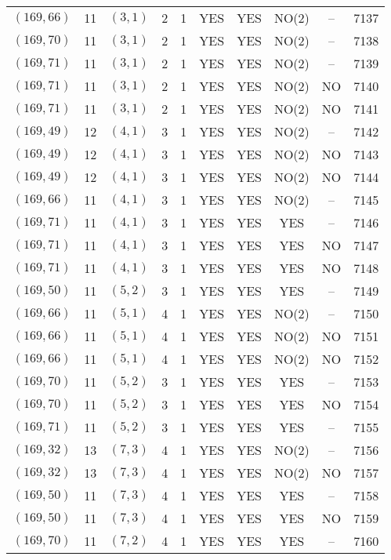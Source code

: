 \begin{longtable}{|c|c|c|c|c|c|c|c|c|c|}
$(169, 66)$ & 11 & $(3, 1)$ & 2 & 1 & YES & YES & NO(2) & -- & 7137\\
$(169, 70)$ & 11 & $(3, 1)$ & 2 & 1 & YES & YES & NO(2) & -- & 7138\\
$(169, 71)$ & 11 & $(3, 1)$ & 2 & 1 & YES & YES & NO(2) & -- & 7139\\
$(169, 71)$ & 11 & $(3, 1)$ & 2 & 1 & YES & YES & NO(2) & NO & 7140\\
$(169, 71)$ & 11 & $(3, 1)$ & 2 & 1 & YES & YES & NO(2) & NO & 7141\\
$(169, 49)$ & 12 & $(4, 1)$ & 3 & 1 & YES & YES & NO(2) & -- & 7142\\
$(169, 49)$ & 12 & $(4, 1)$ & 3 & 1 & YES & YES & NO(2) & NO & 7143\\
$(169, 49)$ & 12 & $(4, 1)$ & 3 & 1 & YES & YES & NO(2) & NO & 7144\\
$(169, 66)$ & 11 & $(4, 1)$ & 3 & 1 & YES & YES & NO(2) & -- & 7145\\
$(169, 71)$ & 11 & $(4, 1)$ & 3 & 1 & YES & YES & YES & -- & 7146\\
$(169, 71)$ & 11 & $(4, 1)$ & 3 & 1 & YES & YES & YES & NO & 7147\\
$(169, 71)$ & 11 & $(4, 1)$ & 3 & 1 & YES & YES & YES & NO & 7148\\
$(169, 50)$ & 11 & $(5, 2)$ & 3 & 1 & YES & YES & YES & -- & 7149\\
$(169, 66)$ & 11 & $(5, 1)$ & 4 & 1 & YES & YES & NO(2) & -- & 7150\\
$(169, 66)$ & 11 & $(5, 1)$ & 4 & 1 & YES & YES & NO(2) & NO & 7151\\
$(169, 66)$ & 11 & $(5, 1)$ & 4 & 1 & YES & YES & NO(2) & NO & 7152\\
$(169, 70)$ & 11 & $(5, 2)$ & 3 & 1 & YES & YES & YES & -- & 7153\\
$(169, 70)$ & 11 & $(5, 2)$ & 3 & 1 & YES & YES & YES & NO & 7154\\
$(169, 71)$ & 11 & $(5, 2)$ & 3 & 1 & YES & YES & YES & -- & 7155\\
$(169, 32)$ & 13 & $(7, 3)$ & 4 & 1 & YES & YES & NO(2) & -- & 7156\\
$(169, 32)$ & 13 & $(7, 3)$ & 4 & 1 & YES & YES & NO(2) & NO & 7157\\
$(169, 50)$ & 11 & $(7, 3)$ & 4 & 1 & YES & YES & YES & -- & 7158\\
$(169, 50)$ & 11 & $(7, 3)$ & 4 & 1 & YES & YES & YES & NO & 7159\\
$(169, 70)$ & 11 & $(7, 2)$ & 4 & 1 & YES & YES & YES & -- & 7160\\

\end{longtable}
